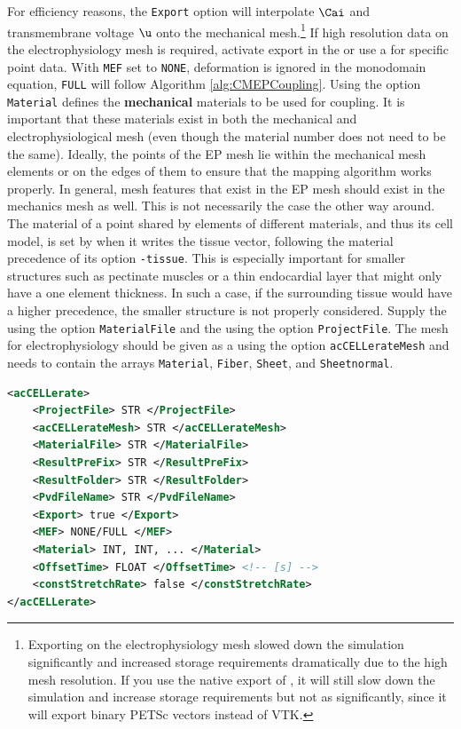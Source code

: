 For efficiency reasons, the \verb|Export| option will interpolate $\Cai$ and transmembrane voltage $\u$ onto the mechanical mesh.\footnote{Exporting on the electrophysiology mesh slowed down the simulation significantly and increased storage requirements dramatically due to the high mesh resolution. If you use the native export of \ACC, it will still slow down the simulation and increase storage requirements but not as significantly, since it will export binary PETSc vectors instead of VTK.}
If high resolution data on the electrophysiology mesh is required, activate export in the  or use a  for specific point data.
With \verb|MEF| set to \verb|NONE|, deformation is ignored in the monodomain equation, \verb|FULL| will follow Algorithm \autoref{alg:CMEPCoupling}.
Using the option \verb|Material| defines the \textbf{mechanical} materials to be used for coupling.
It is important that these materials exist in both the mechanical and electrophysiological mesh (even though the material number does not need to be the same).
Ideally, the points of the EP mesh lie within the mechanical mesh elements or on the edges of them to ensure that the mapping algorithm works properly.
In general, mesh features that exist in the EP mesh should exist in the mechanics mesh as well.
This is not necessarily the case the other way around.
The material of a point shared by elements of different materials, and thus its cell model, is set by  when it writes the tissue vector, following the material precedence of its option \verb|-tissue|.
This is especially important for smaller structures such as pectinate muscles or a thin endocardial layer that might only have a one element thickness.
In such a case, if the surrounding tissue would have a higher precedence, the smaller structure is not properly considered.
Supply the  using the option \verb|MaterialFile| and the  using the option \verb|ProjectFile|.
The mesh for electrophysiology should be given as a 
using the option \verb|acCELLerateMesh| and needs to contain the arrays \verb|Material|, \verb|Fiber|, \verb|Sheet|, and \verb|Sheetnormal|.

\begin{lstlisting}[language=XML,caption=.xml settings for the acCELLerate plugin]
<acCELLerate>
    <ProjectFile> STR </ProjectFile>
    <acCELLerateMesh> STR </acCELLerateMesh>
    <MaterialFile> STR </MaterialFile>
    <ResultPreFix> STR </ResultPreFix>
    <ResultFolder> STR </ResultFolder>
    <PvdFileName> STR </PvdFileName>
    <Export> true </Export>
    <MEF> NONE/FULL </MEF>
    <Material> INT, INT, ... </Material>
    <OffsetTime> FLOAT </OffsetTime> <!-- [s] -->
    <constStretchRate> false </constStretchRate>
</acCELLerate>
\end{lstlisting}

